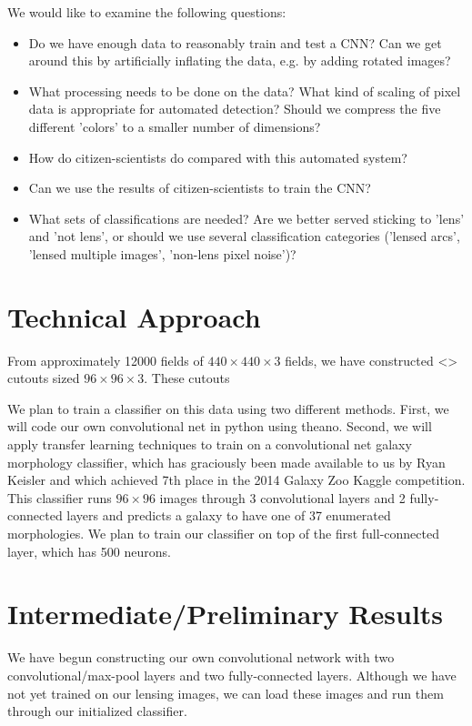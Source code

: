 \documentclass[10pt,twocolumn,letterpaper]{article}
\begin{document}
We would like to examine the following questions:
\begin{itemize}
\item{ Do we have enough data to reasonably train and test a CNN? Can we get
       around this by artificially inflating the data, e.g. by adding rotated
     images?}
\item{ What processing needs to be done on the data? What kind of scaling of
       pixel data is appropriate for automated detection? Should we compress
     the five different 'colors' to a smaller number of dimensions?}
   \item{ How do citizen-scientists do compared with this automated system?}
   \item{Can we use the results of citizen-scientists to train the CNN?}
\item{What sets of classifications are needed? Are we better served sticking
       to 'lens' and 'not lens', or should we use several classification
       categories ('lensed arcs', 'lensed multiple images', 'non-lens pixel
     noise')?}
\end{itemize}

\section{Technical Approach}

From approximately 12000 fields of $440\times440\times3$ fields, we have
constructed <> cutouts sized $96\times96\times3$. These cutouts 


We plan to train a classifier on this data using two different methods. First, we will code 
our own convolutional net in python using theano. Second, we will apply transfer learning 
techniques to train on a convolutional net galaxy morphology classifier, which has graciously 
been made available to us by Ryan Keisler and which achieved 7th place in the 2014 Galaxy 
Zoo Kaggle competition. This classifier runs $96\times96$ images through 3 convolutional 
layers and 2 fully-connected layers and predicts a galaxy to have one of 37 enumerated 
morphologies. We plan to train our classifier on top of the first full-connected layer, which 
has 500 neurons. 

\section{Intermediate/Preliminary Results}

We have begun constructing our own convolutional network with two convolutional/max-pool 
layers and two fully-connected layers. Although we have not yet trained on our lensing images,
we can load these images and run them through our initialized classifier.

% 
% 
\end{document}
